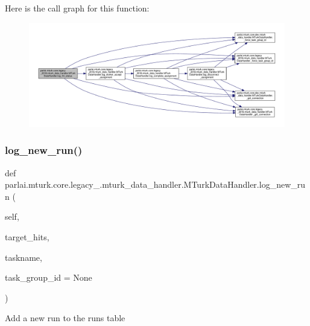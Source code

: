 Here is the call graph for this function\+:
\nopagebreak
\begin{figure}[H]
\begin{center}
\leavevmode
\includegraphics[width=350pt]{classparlai_1_1mturk_1_1core_1_1legacy__2018_1_1mturk__data__handler_1_1MTurkDataHandler_a1b7db2687208e1af513fa590a6380779_cgraph}
\end{center}
\end{figure}
\mbox{\label{classparlai_1_1mturk_1_1core_1_1legacy__2018_1_1mturk__data__handler_1_1MTurkDataHandler_a0bc9f338e92aa4c1dc7a0f09e743b01e}} 
\subsubsection{\texorpdfstring{log\+\_\+new\+\_\+run()}{log\_new\_run()}}
{\footnotesize\ttfamily def parlai.\+mturk.\+core.\+legacy\+\_.\+mturk\+\_\+data\+\_\+handler.\+M\+Turk\+Data\+Handler.\+log\+\_\+new\+\_\+run (\begin{DoxyParamCaption}\item[{}]{self,  }\item[{}]{target\+\_\+hits,  }\item[{}]{taskname,  }\item[{}]{task\+\_\+group\+\_\+id = {\ttfamily None} }\end{DoxyParamCaption})}

\begin{DoxyVerb}Add a new run to the runs table\end{DoxyVerb}
 

